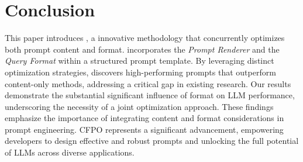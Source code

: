 \section{Conclusion}



This paper introduces \fullsysname{}, a innovative methodology that concurrently optimizes both prompt content and format. \sysname{} incorporates the \textit{Prompt Renderer} and the \textit{Query Format} within a structured prompt template. By leveraging distinct optimization strategies, \sysname{} discovers high-performing prompts that outperform content-only methods, addressing a critical gap in existing research. Our results demonstrate the substantial significant influence of format on LLM performance, underscoring the necessity of a joint optimization approach. These findings emphasize the importance of integrating content and format considerations in prompt engineering. CFPO represents a significant advancement, empowering developers to design effective and robust prompts and unlocking the full potential of LLMs across diverse applications.
